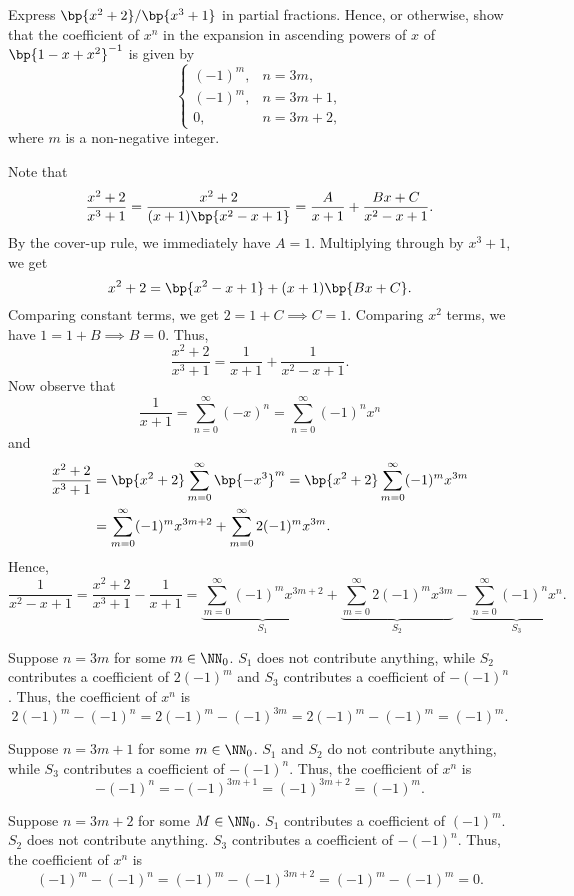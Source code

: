 \begin{problem}
    Express $\bp{x^2 + 2}/\bp{x^3 + 1}$ in partial fractions. Hence, or otherwise, show that the coefficient of $x^n$ in the expansion in ascending powers of $x$ of $\bp{1 - x + x^2}^{-1}$ is given by \[\begin{cases}
        (-1)^m, & n = 3m,\\
        (-1)^m, & n = 3m+1,\\
        0, & n = 3m+2,
    \end{cases}\] where $m$ is a non-negative integer.
\end{problem}
\begin{solution}
    Note that \[\frac{x^2 + 2}{x^3 + 1} = \frac{x^2 + 2}{(x+1)\bp{x^2 - x + 1}} = \frac{A}{x+1} + \frac{Bx + C}{x^2 - x + 1}.\] By the cover-up rule, we immediately have $A = 1$. Multiplying through by $x^3 + 1$, we get \[x^2 + 2 = \bp{x^2 - x + 1} + (x+1)\bp{Bx + C}.\] Comparing constant terms, we get $2 = 1 + C \implies C = 1$. Comparing $x^2$ terms, we have $1 = 1 + B \implies B = 0$. Thus, \[\frac{x^2 + 2}{x^3 + 1} = \frac{1}{x + 1} + \frac{1}{x^2 - x + 1}.\] Now observe that \[\frac1{x + 1} = \sum_{n = 0}^\infty (-x)^n = \sum_{n = 0}^\infty (-1)^n x^n\] and
    \begin{align*}
        \frac{x^2 + 2}{x^3 + 1} &= \bp{x^2 + 2} \sum_{m = 0}^\infty \bp{-x^3}^m = \bp{x^2 + 2} \sum_{m = 0}^\infty (-1)^m x^{3m}\\
        &= \sum_{m = 0}^\infty (-1)^m x^{3m + 2} + \sum_{m = 0}^\infty 2(-1)^m x^{3m}.    
    \end{align*}
    Hence, \[\frac1{x^2 - x + 1} = \frac{x^2 + 2}{x^3 + 1} - \frac{1}{x + 1} = \underbrace{\sum_{m = 0}^\infty (-1)^m x^{3m + 2}}_{S_1} + \underbrace{\sum_{m = 0}^\infty 2(-1)^m x^{3m}}_{S_2} - \underbrace{\sum_{n = 0}^\infty (-1)^n x^n}_{S_3}.\]

     Suppose $n = 3m$ for some $m \in \NN_0$. $S_1$ does not contribute anything, while $S_2$ contributes a coefficient of $2(-1)^m$ and $S_3$ contributes a coefficient of $-(-1)^n$. Thus, the coefficient of $x^n$ is \[2(-1)^m - (-1)^n = 2(-1)^m - (-1)^{3m} = 2(-1)^m - (-1)^m = (-1)^m.\]

     Suppose $n = 3m+1$ for some $m \in \NN_0$. $S_1$ and $S_2$ do not contribute anything, while $S_3$ contributes a coefficient of $-(-1)^n$. Thus, the coefficient of $x^n$ is \[-(-1)^{n} = -(-1)^{3m+1} = (-1)^{3m+2} = (-1)^m.\]

     Suppose $n = 3m+2$ for some $M \in \NN_0$. $S_1$ contributes a coefficient of $(-1)^m$. $S_2$ does not contribute anything. $S_3$ contributes a coefficient of $-(-1)^n$. Thus, the coefficient of $x^n$ is \[(-1)^m - (-1)^n = (-1)^m - (-1)^{3m+2} = (-1)^m - (-1)^{m} = 0.\]
\end{solution}

